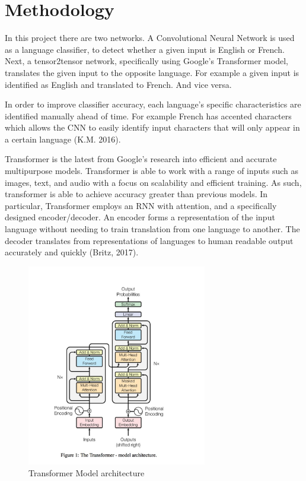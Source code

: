 \documentclass[10pt,a4paper]{article}
\begin{document}
\clearpage


\section{Methodology}

In this project there are two networks. A Convolutional Neural Network is used as a language classifier, to detect whether a given input is English or French. Next, a tensor2tensor network, specifically using Google's Transformer model, translates the given input to the opposite language. For example a given input is identified as English and translated to French. And vice versa.
  
  
In order to improve classifier accuracy, each language’s specific characteristics are identified manually ahead of time. For example French has accented characters which allows the CNN to easily identify input characters that will only appear in a certain language (K.M. 2016).
  
  
 Transformer is the latest from Google's research into efficient and accurate multipurpose models. Transformer is able to work with a range of inputs such as images, text, and audio with a focus on scalability and efficient training. As such, transformer is able to achieve accuracy greater than previous models. In particular, Transformer employs an RNN with attention, and a specifically designed encoder/decoder. An encoder forms a representation of the input language without needing to train translation from one language to another. The decoder translates from representations of languages to human readable output accurately and quickly (Britz, 2017).
   
   
\begin{figure}[H]
  \begin{center}
    \includegraphics[width=0.7\textwidth] {transformer.jpg}
    \caption{Transformer Model architecture}
  \end{center}
\end{figure}
\end{document}

